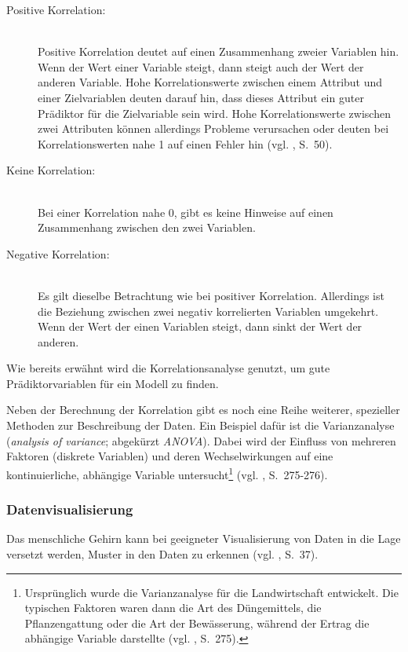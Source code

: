 \begin{description}

\item[Positive Korrelation:] \hfill \\
Positive Korrelation deutet auf einen Zusammenhang zweier Variablen hin. Wenn der Wert einer Variable steigt,
dann steigt auch der Wert der anderen Variable. Hohe Korrelationswerte zwischen einem Attribut und einer
Zielvariablen deuten darauf hin, dass dieses Attribut ein guter Prädiktor für die Zielvariable sein wird.
Hohe Korrelationswerte zwischen zwei Attributen können allerdings Probleme verursachen oder deuten bei Korrelationswerten nahe 1 auf einen
Fehler hin (vgl. \cite{Bowles}, S.~50).

\item[Keine Korrelation:] \hfill \\
Bei einer Korrelation nahe 0, gibt es keine Hinweise auf einen Zusammenhang zwischen den zwei Variablen.

\item[Negative Korrelation:] \hfill \\
Es gilt dieselbe Betrachtung wie bei positiver Korrelation. Allerdings ist die Beziehung zwischen zwei negativ korrelierten Variablen
umgekehrt. Wenn der Wert der einen Variablen steigt, dann sinkt der Wert der anderen.

\end{description}
Wie bereits erwähnt wird die Korrelationsanalyse genutzt, um gute Prädiktorvariablen für ein Modell zu finden.

Neben der Berechnung der Korrelation gibt es noch eine Reihe weiterer, spezieller
Methoden zur Beschreibung der Daten. Ein Beispiel dafür ist die Varianzanalyse
(\emph{analysis of variance}; abgekürzt \emph{ANOVA}). Dabei wird der Einfluss
von mehreren Faktoren (diskrete Variablen) und deren Wechselwirkungen auf eine
kontinuierliche, abhängige Variable untersucht\footnote{
Ursprünglich wurde die Varianzanalyse für die Landwirtschaft entwickelt. Die
typischen Faktoren waren dann die Art des Düngemittels, die Pflanzengattung oder
die Art der Bewässerung, während der Ertrag die abhängige Variable darstellte
(vgl. \cite{Bijma}, S.~275).
} (vgl. \cite{Bijma}, S.~275-276).

\subsubsection{Datenvisualisierung}

Das menschliche Gehirn kann bei geeigneter Visualisierung von Daten in die Lage
versetzt werden, Muster in den Daten zu erkennen (vgl. \cite{Runkler}, S.~37).


